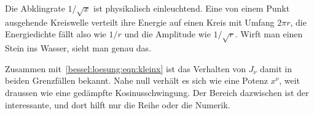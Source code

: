 Die Abklingrate $1/\sqrt{x}$ ist physikalisch einleuchtend.
Eine von einem Punkt ausgehende Kreiswelle verteilt ihre Energie auf einen Kreis mit Umfang $2\pi r$, die Energiedichte fällt also wie $1/r$ und die Amplitude wie $1/\sqrt{r}$.
Wirft man einen Stein ins Wasser, sieht man genau das.

Zusammen mit~\eqref{bessel:loesung:eqn:kleinx} ist das Verhalten von $J_\nu$ damit in beiden Grenzfällen bekannt.
Nahe null verhält es sich wie eine Potenz $x^\nu$, weit draussen wie eine gedämpfte Kosinusschwingung.
Der Bereich dazwischen ist der interessante, und dort hilft nur die Reihe oder die Numerik.
